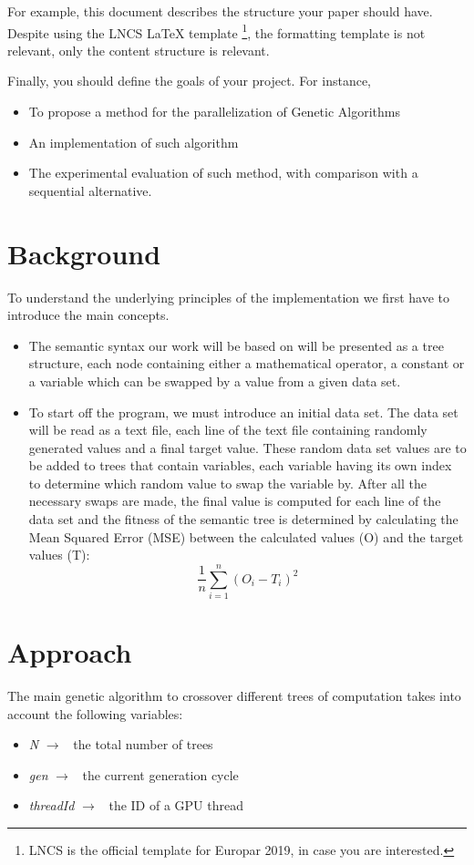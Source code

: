 \documentclass[runningheads]{llncs}
\begin{document}
For example, this document describes the structure your paper should have. Despite using the LNCS LaTeX template \footnote{LNCS is the official template for Europar 2019, in case you are interested.}, the formatting template is not relevant, only the content structure is relevant.

Finally, you should define the goals of your project. For instance,

\begin{itemize}
	\item To propose a method for the parallelization of Genetic Algorithms
	\item An implementation of such algorithm
	\item The experimental evaluation of such method, with comparison with a sequential alternative.
\end{itemize}


\section{Background}
To understand the underlying principles of the implementation we first have to introduce the main concepts.
\begin{itemize}
	\item The semantic syntax our work will be based on will be presented as a tree structure, each node containing either a mathematical operator, a constant or a variable which can be swapped by a value from a given data set.
	\item To start off the program, we must introduce an initial data set. The data set will be read as a text file, each line of the text file containing randomly generated values and a final target value. These random data set values are to be added to trees that contain variables, each variable having its own index to determine which random value to swap the variable by. After all the necessary swaps are made, the final value is computed for each line of the data set and the fitness of the semantic tree is determined by calculating the Mean Squared Error (MSE) between the calculated values (O) and the target values (T): $$\frac{1}{n}\sum_{i=1}^{n} (O_i - T_i)^{2}$$
\end{itemize}

\section{Approach}
The main genetic algorithm to crossover different trees of computation takes into account the following variables:
\begin{itemize}
	\item \textit{N} $\rightarrow$ \ the total number of trees
	\item \textit{gen} $\rightarrow$ \ the current generation cycle
	\item \textit{threadId} $\rightarrow$ \ the ID of a GPU thread
\end{itemize}
\end{document}

